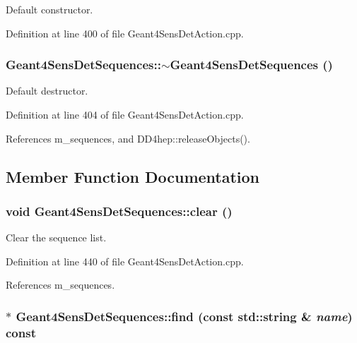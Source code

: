 Default constructor. 

Definition at line 400 of file Geant4SensDetAction.cpp.\hypertarget{class_d_d4hep_1_1_simulation_1_1_geant4_sens_det_sequences_a6f27557827175da8f038b84959cb109d}{
\subsubsection[{$\sim$Geant4SensDetSequences}]{\setlength{\rightskip}{0pt plus 5cm}Geant4SensDetSequences::$\sim$Geant4SensDetSequences ()}}
\label{class_d_d4hep_1_1_simulation_1_1_geant4_sens_det_sequences_a6f27557827175da8f038b84959cb109d}


Default destructor. 

Definition at line 404 of file Geant4SensDetAction.cpp.

References m\_\-sequences, and DD4hep::releaseObjects().

\subsection{Member Function Documentation}
\hypertarget{class_d_d4hep_1_1_simulation_1_1_geant4_sens_det_sequences_ad30860ebb23e7fbbaf18c8a7194ae6cc}{
\subsubsection[{clear}]{\setlength{\rightskip}{0pt plus 5cm}void Geant4SensDetSequences::clear ()}}
\label{class_d_d4hep_1_1_simulation_1_1_geant4_sens_det_sequences_ad30860ebb23e7fbbaf18c8a7194ae6cc}


Clear the sequence list. 

Definition at line 440 of file Geant4SensDetAction.cpp.

References m\_\-sequences.\hypertarget{class_d_d4hep_1_1_simulation_1_1_geant4_sens_det_sequences_a3eab0a62ebd3ebf84c311732e40bc162}{
\subsubsection[{find}]{ $\ast$ Geant4SensDetSequences::find (const std::string \& {\em name}) const}}
\label{class_d_d4hep_1_1_simulation_1_1_geant4_sens_det_sequences_a3eab0a62ebd3ebf84c311732e40bc162}


